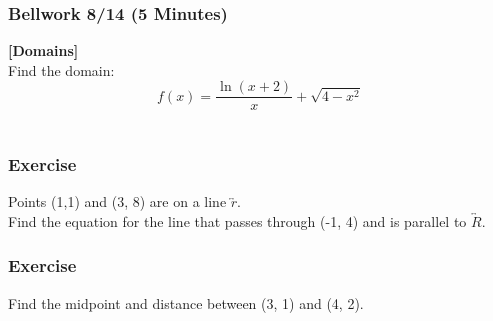 \documentclass[12pt]{beamer}
\begin{document}
\begin{frame}
	\frametitle{Bellwork 8/14 (5 Minutes)}
	\initclock
	\Large
	\textbf{[Domains]}\vspace{.2cm}\\
	\vspace*{\fill}
	Find the domain:
	\vspace*{\fill}
	\[f(x)=\frac{\ln\left(x+2\right)}{x}+\sqrt{4-x^{2}}\]\\
	\vspace*{\fill}
	\vspace*{\fill}
	\vspace*{\fill}
	\vspace*{\fill}
	\crono
\end{frame}
\begin{frame}
	\frametitle{Exercise}
	\vspace*{\fill}
	\vspace*{\fill}
	\vspace*{\fill}
	\vspace*{\fill}
	\initclock
	Points (1,1) and (3, 8) are on a line $\overleftrightarrow{r}$.\\
	\vspace*{\fill}
	Find the equation for the line that passes through (-1, 4) and is parallel to $\overleftrightarrow{R}$.\\
	\vspace*{\fill}
	\vspace*{\fill}
	\vspace*{\fill}
	\vspace*{\fill}
	\crono
\end{frame}
\begin{frame}
	\frametitle{Exercise}
	\vspace*{\fill}
	\vspace*{\fill}
	\vspace*{\fill}
	\vspace*{\fill}
	\initclock
	Find the midpoint and distance between (3, 1) and (4, 2).\\
	\vspace*{\fill}
	\vspace*{\fill}
	\vspace*{\fill}
	\vspace*{\fill}
	\crono
\end{frame}
\end{document}
